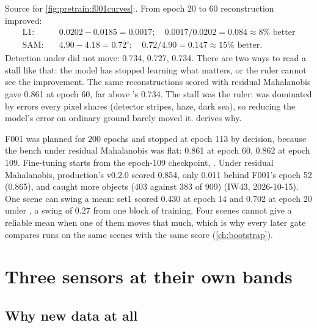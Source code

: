 Source for \cref{fig:pretrain:f001curves}:\tbrk{}.
From epoch 20 to 60 reconstruction improved:
\begin{align*}
  \text{L1:}&\quad 0.0202 - 0.0185 = 0.0017;\quad 0.0017 / 0.0202 = 0.084 \approx 8\% \text{ better}\\
  \text{SAM:}&\quad 4.90 - 4.18 = 0.72^\circ;\quad 0.72 / 4.90 = 0.147 \approx 15\% \text{ better.}
\end{align*}
Detection under  did not move: 0.734, 0.727, 0.734. There are two ways to read a stall like that: the model
has stopped learning what matters, or the ruler cannot see the improvement. The same reconstructions scored with residual
Mahalanobis gave 0.861 at epoch 60, far above 's 0.734. The stall was the ruler:  was dominated
by errors every pixel shares (detector stripes, haze, dark sea), so reducing the model's error on ordinary ground barely moved
it.  derives why.


\begin{drift}
F001 was planned for 200 epochs and stopped at epoch 113 by decision, because the bench under residual Mahalanobis was flat:
0.861 at epoch 60, 0.862 at epoch 109.\tbrk{} Fine-tuning starts from the
epoch-109 checkpoint, . Under residual Mahalanobis, production's v0.2.0 scored 0.854, only 0.011 behind F001's
epoch 52 (0.865), and caught more objects (403 against 383 of 909) (IW43, 2026-10-15). One scene can swing a mean: set1 scored
0.430 at epoch 14 and 0.702 at epoch 20 under , a swing of 0.27 from one block of training. Four scenes cannot
give a reliable mean when one of them moves that much, which is why every later gate compares runs on the same scenes with the
same score (\cref{ch:bootstrap}).
\end{drift}

\section{Three sensors at their own bands}\label{sec:pretrain:native}

\subsection{Why new data at all}

